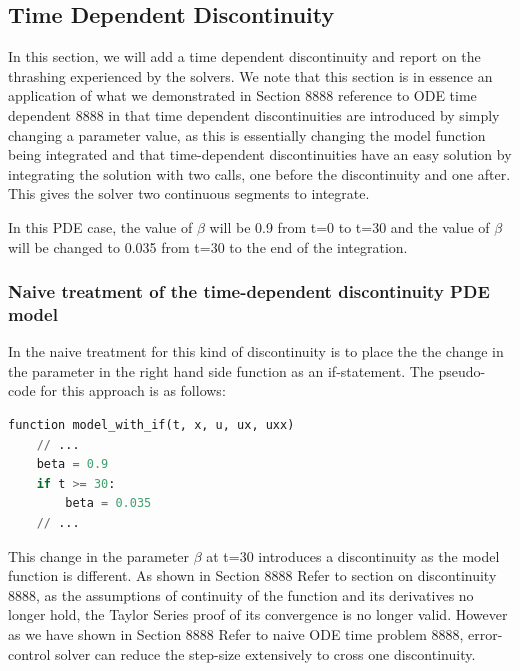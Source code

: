 \documentclass{article}
\begin{document}
\subsection{Time Dependent Discontinuity}
\label{subsection:pde_time_intro}
In this section, we will add a time dependent discontinuity and report on the thrashing experienced by the solvers. We note that this section is in essence an application of what we demonstrated in Section 8888 reference to ODE time dependent 8888 in that time dependent discontinuities are introduced by simply changing a parameter value, as this is essentially changing the model function being integrated and that time-dependent discontinuities have an easy solution by integrating the solution with two calls, one before the discontinuity and one after. This gives the solver two continuous segments to integrate.

In this PDE case, the value of $\beta$ will be 0.9 from t=0 to t=30 and the value of $\beta$ will be changed to 0.035 from t=30 to the end of the integration.

\subsubsection{Naive treatment of the time-dependent discontinuity PDE model}
\label{subsubsection:pde_time_naive}
In the naive treatment for this kind of discontinuity is to place the the change in the parameter in the right hand side function as an if-statement. The pseudo-code for this approach is as follows:

\begin{minipage}{\linewidth}
\begin{lstlisting}[language=Python]
function model_with_if(t, x, u, ux, uxx)
    // ...
    beta = 0.9
    if t >= 30:
        beta = 0.035
    // ...

\end{lstlisting}
\end{minipage}

This change in the parameter $\beta$ at t=30 introduces a discontinuity as the model function is different. As shown in Section 8888 Refer to section on discontinuity 8888, as the assumptions of continuity of the function and its derivatives no longer hold, the Taylor Series proof of its convergence is no longer valid. However as we have shown in Section 8888 Refer to naive ODE time problem 8888, error-control solver can reduce the step-size extensively to cross one discontinuity.
\end{document}

